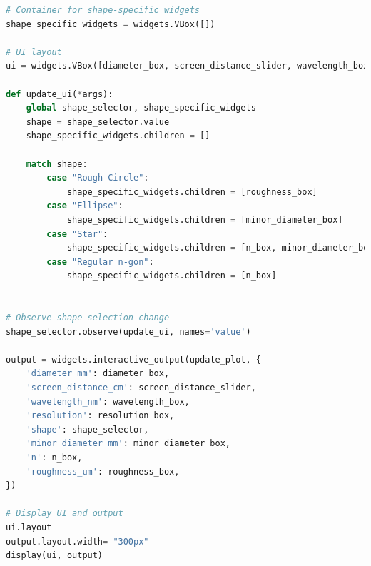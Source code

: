\documentclass[11pt,a4paper]{article}
\begin{document}
\begin{lstlisting}[language=Python]
# Container for shape-specific widgets
shape_specific_widgets = widgets.VBox([])

# UI layout
ui = widgets.VBox([diameter_box, screen_distance_slider, wavelength_box, resolution_box, shape_selector, shape_specific_widgets])

def update_ui(*args):
    global shape_selector, shape_specific_widgets
    shape = shape_selector.value
    shape_specific_widgets.children = []
    
    match shape:
        case "Rough Circle":
            shape_specific_widgets.children = [roughness_box]
        case "Ellipse":
            shape_specific_widgets.children = [minor_diameter_box]
        case "Star":
            shape_specific_widgets.children = [n_box, minor_diameter_box]
        case "Regular n-gon":
            shape_specific_widgets.children = [n_box]


# Observe shape selection change
shape_selector.observe(update_ui, names='value')

output = widgets.interactive_output(update_plot, {
    'diameter_mm': diameter_box, 
    'screen_distance_cm': screen_distance_slider,
    'wavelength_nm': wavelength_box,
    'resolution': resolution_box,
    'shape': shape_selector,
    'minor_diameter_mm': minor_diameter_box,
    'n': n_box,
    'roughness_um': roughness_box,
})

# Display UI and output
ui.layout
output.layout.width= "300px"
display(ui, output)

\end{lstlisting}
\end{document}
